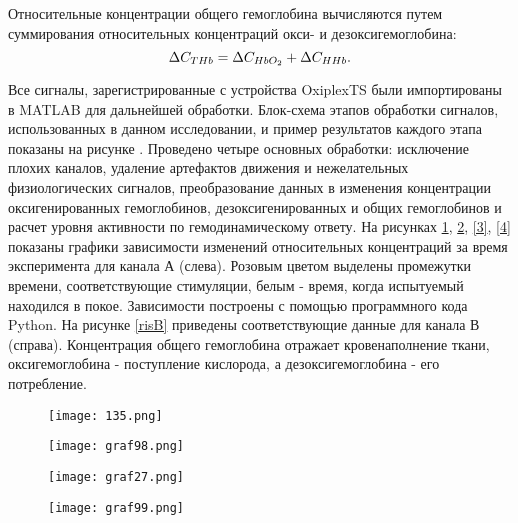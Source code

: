 Относительные концентрации общего гемоглобина вычисляются путем суммирования относительных концентраций окси- и дезоксигемоглобина:
\begin{equation}\label{ob}
\large \Delta C_{THb}=\Delta C_{HbO_2}+\Delta C_{HHb}.
\end{equation}

Все сигналы, зарегистрированные с устройства OxiplexTS были импортированы в MATLAB для дальнейшей обработки. Блок-схема этапов обработки сигналов, использованных в данном исследовании, и пример результатов каждого этапа показаны на рисунке . Проведено четыре основных обработки: исключение плохих каналов, удаление артефактов движения и нежелательных физиологических сигналов, преобразование данных в изменения концентрации оксигенированных гемоглобинов, дезоксигенированных и общих гемоглобинов и расчет уровня активности по гемодинамическому ответу.
На рисунках \ref{1}, \ref{2},  \ref{3}, \ref{4} показаны графики зависимости изменений относительных концентраций за время эксперимента для канала А (слева). Розовым цветом выделены промежутки времени, соответствующие стимуляции, белым - время, когда испытуемый находился в покое. Зависимости построены с помощью программного кода Python. На рисунке \ref{risB} приведены соответствующие данные для канала В (справа). Концентрация общего гемоглобина отражает кровенаполнение ткани, оксигемоглобина - поступление кислорода, а дезоксигемоглобина - его потребление.

\begin{figure}[!h]
\begin{center}
\begin{minipage}[h]{0.48\linewidth}
\texttt{[image: 135.png]}
\end{minipage}
\begin{minipage}[h]{0.48\linewidth}
\texttt{[image: graf98.png]}
\end{minipage}
\caption{\centering {}}
\label{1}
\end{center}
\end{figure}
\vspace{-5mm}

\begin{figure}[!h]
\begin{center}
\begin{minipage}[h]{0.48\linewidth}
\texttt{[image: graf27.png]}
\end{minipage}
\begin{minipage}[h]{0.48\linewidth}
\texttt{[image: graf99.png]}
\end{minipage}
\caption{\centering {}}
\label{2}
\end{center}
\end{figure}

